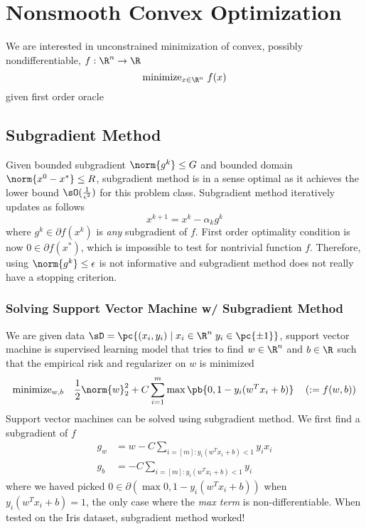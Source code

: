 \documentclass[11pt]{article}
\begin{document}
\section{Nonsmooth Convex Optimization}

We are interested in unconstrained minimization of convex, possibly nondifferentiable, $f:\R^n \to \R$ 
\[
    \text{minimize}_{x\in\R^n}\; f(x)
\]
given first order oracle

\subsection{Subgradient Method}

Given bounded subgradient $\norm{g^k}\leq G$ and bounded domain $\norm{x^0 - x^*} \leq R$, subgradient method is in a sense optimal as it achieves the lower bound $\sO(\frac{1}{\epsilon^2})$ for this problem class. Subgradient method iteratively updates as follows
\[
    x^{k+1}
        = x^k - \alpha_k g^k    
\]
where $g^k \in\partial f(x^k)$ is \textit{any} subgradient of $f$. First order optimality condition is now $0\in\partial f(x^*)$, which is impossible to test for nontrivial function $f$. Therefore, using $\norm{g^k}\leq \epsilon$ is not informative and subgradient method does not really have a stopping criterion.

\subsubsection{Solving Support Vector Machine w/ Subgradient Method}

We are given data $\sD = \pc{(x_i,y_i) \mid x_i\in\R^n \; y_i \in \pc{\pm 1}}$, support vector machine is supervised learning model that tries to find $w\in\R^n$ and $b\in\R$ such that the empirical risk and regularizer on $w$ is minimized
\begin{align*}
    \text{minimize}_{w,b} \quad
        \frac{1}{2} \norm{w}_2^2 + C \sum_{i=1}^m \max\pb{0, 1 - y_i(w^Tx_i + b)} 
        \quad \left( := f(w,b) \right)
\end{align*}
Support vector machines can be solved using subgradient method. We first find a subgradient of $f$
\begin{align*}
    g_w
        &= w - C\sum_{i=[m]: y_i(w^Tx_i + b) < 1 } y_i x_i \\
    g_b
        &= -C\sum_{i=[m]: y_i(w^Tx_i + b) < 1 } y_i
\end{align*}
where we haved picked $0\in\partial (\max{0, 1- y_i(w^Tx_i + b)})$ when $y_i(w^Tx_i + b) = 1$, the only case where the \textit{max term} is non-differentiable. When tested on the Iris dataset, subgradient method worked!

\printbibliography 
\end{document}
